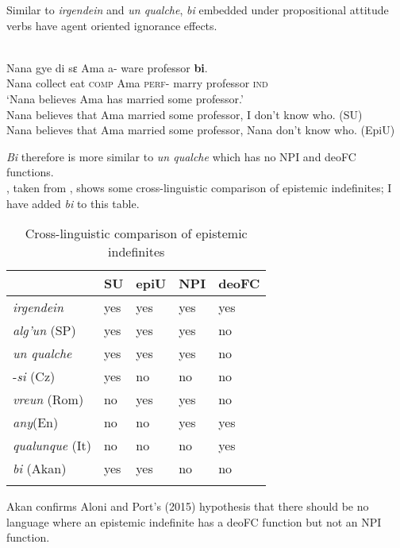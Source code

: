 \documentclass[output=paper,modfonts,nonflat,draftmode]{langsci/langscibook}
\begin{document}
Similar to \emph{irgendein} and \emph{un qualche}, \emph{bi} embedded under propositional attitude verbs have agent oriented ignorance effects.  

 \ea\label{owusu:ex42}\\
 \gll  Nana gye di sε Ama a- ware professor \textbf{bi}. \\
Nana collect eat \textsc{comp} Ama \textsc{perf}- marry professor \textsc{ind}\\
\glt `Nana believes Ama has married some professor.' \\
Nana believes that Ama married some professor, I don't know who. (SU)\\
Nana believes that Ama married some professor, Nana don't know who. (EpiU)
\z 

\emph{Bi} therefore is more similar to \emph{un qualche} which has no NPI and deoFC functions. \\
 , taken from \citet{AloniPort2015}, shows some cross-linguistic comparison of epistemic indefinites; I have added \emph{bi} to this table.\\

\begin{table}
\caption{Cross-linguistic comparison of epistemic indefinites}
	\begin{tabularx}{.8\textwidth}{lXXXX}
		\lsptoprule
		{}		& SU		& 	epiU & NPI & deoFC \\ 
		\midrule 
		\emph{irgendein} 			& yes 		& 	yes	& 	yes	& 	yes	\\ 
		\emph{alg'un} (SP)        & yes 	 	& 	yes 	& 	yes & 	no		\\ 
		 \emph{un qualche} 		& yes 	 	& 	yes 	& 	yes & 	no \\		
		-\emph{si} (Cz)	& 	yes	& 	no &	 no & no			\\ 
		\emph{vreun} (Rom) 		& no	 	& 	yes 	& 	yes & 	no \\			
		\emph{any}(En) 		& no 	 	& 	no 	& 	yes & 	yes \\			
		\emph{qualunque} (It)		& no	 	& 	no 	& 	no & 	yes \\		
		\emph{bi} (Akan) 		& yes 	 	& 	yes 	& 	no & 	no \\		
		\lspbottomrule
	\end{tabularx}
	\label{tab:owusu:1}
    \end{table}
    
Akan confirms Aloni and Port's (2015) hypothesis that there should be no language where an epistemic indefinite has a deoFC function but not an NPI function. 
\end{document}
